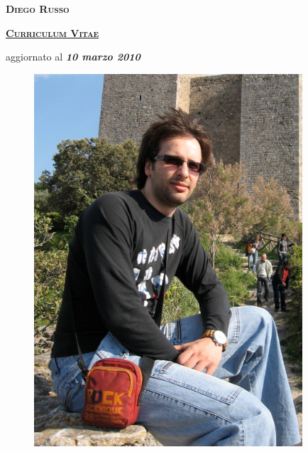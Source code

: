 \documentclass[totpages,helvetica,openbib,italian]{europecv}
\begin{document}
    \begin{center}
        \hspace{1pt}
        \vspace{2cm}
    
        {\scshape \textbf{\Huge Diego Russo}}
    
        \vspace{1cm}
    
        {\scshape \textbf{\large \underline{Curriculum Vitae}}}
    
        \vspace{0.25cm}
    
        aggiornato al \emph{\textbf{10 marzo 2010}}
        
        \vspace{2cm}
        
        \begin{figure}[htbp] 
            \begin{center} 
                \includegraphics[width=10cm]{io.jpg}
            \end{center} 
        \end{figure}
        
    \end{center}
\pagebreak
{}
\end{document}
